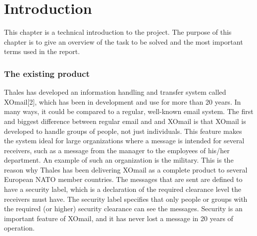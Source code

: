 \chapter{Introduction}

This chapter is a technical introduction to the project. The purpose of this chapter is to give an overview of the task to be solved and the most important terms used in the report.

\subsection*{The existing product}
Thales has developed an information handling and transfer system called XOmail[2], which has been in development and use for more than 20 years. In many ways, it could be compared to a regular, well-known email system. The first and biggest difference between regular email and and XOmail is that XOmail is developed to handle groups of people, not just individuals. This feature makes the system ideal for large organizations where a message is intended for several receivers, such as a message from the manager to the employees of his/her department. An example of such an organization is the military. This is the reason why Thales has been delivering XOmail as a complete product to several European NATO member countries.  
\newline
\newline
The messages that are sent are defined to have a security label, which is a declaration of the required clearance level the receivers must have. The security label specifies that only people or groups with the required (or higher) security clearance can see the messages. Security is an important feature of XOmail, and it has never lost a message in 20 years of operation. 

